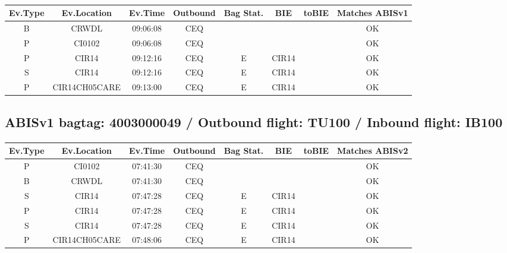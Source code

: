 \documentclass{report}
\begin{document}
\paragraph{}
\begin{longtable}{cccccccc}    \toprule
\rowcolor{white!50}
\textbf{Ev.Type} & \textbf{Ev.Location} & \textbf{Ev.Time} & \textbf{Outbound} & \textbf{Bag Stat.} & \textbf{BIE} & \textbf{toBIE} & \textbf{Matches ABISv1} \\\midrule
B & CRWDL & 09:06:08  & CEQ &  &  &  & OK\\
P & CI0102 & 09:06:08  & CEQ &  &  &  & OK\\
P & CIR14 & 09:12:16  & CEQ & E & CIR14 &  & OK\\
S & CIR14 & 09:12:16  & CEQ & E & CIR14 &  & OK\\
P & CIR14CH05CARE & 09:13:00  & CEQ & E & CIR14 &  & OK\\
\bottomrule
\end{longtable}
\subsection*{ABISv1 bagtag: 4003000049 / Outbound flight: TU100 / Inbound flight: IB100}
\paragraph{}
\begin{longtable}{cccccccc}    \toprule
\rowcolor{white!50}
\textbf{Ev.Type} & \textbf{Ev.Location} & \textbf{Ev.Time} & \textbf{Outbound} & \textbf{Bag Stat.} & \textbf{BIE} & \textbf{toBIE} & \textbf{Matches ABISv2} \\\midrule
P & CI0102 & 07:41:30  & CEQ &  &  &  & OK\\
B & CRWDL & 07:41:30  & CEQ &  &  &  & OK\\
S & CIR14 & 07:47:28  & CEQ & E & CIR14 &  & OK\\
P & CIR14 & 07:47:28  & CEQ & E & CIR14 &  & OK\\
S & CIR14 & 07:47:28  & CEQ & E & CIR14 &  & OK\\
P & CIR14CH05CARE & 07:48:06  & CEQ & E & CIR14 &  & OK\\
\bottomrule
\end{longtable}
\pagebreak
\end{document}
